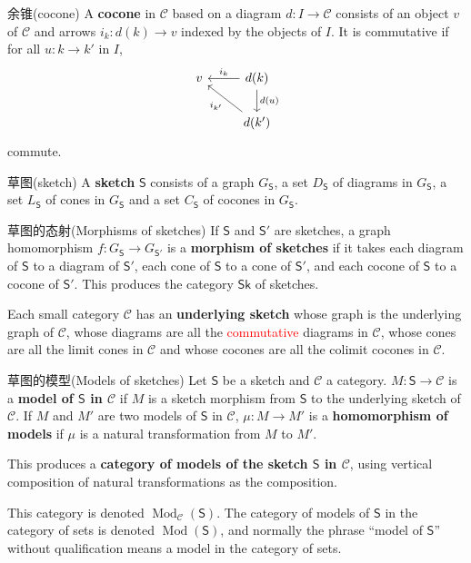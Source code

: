 \documentclass{beamer}
\begin{document}
\begin{frame}[fragile]{余锥(cocone)}
A \textbf{cocone} in $\mathcal{C}$ based on a diagram $d\colon I \to \mathcal{C}$ consists of an object $v$ of $\mathcal{C}$ and arrows $i_k\colon d(k) \to v$ indexed by the objects of $I$. It is commutative if for all $u\colon k \to k'$ in $I$,
\[
\begin{tikzcd}
v & d(k) \arrow[l, "i_k"'] \arrow[d, "d(u)"] \\
& d(k') \arrow[ul, "i_{k'}"]
\end{tikzcd}
\]
commute.
\end{frame}

\begin{frame}{草图(sketch)}
A \textbf{sketch} $\mathsf{S}$ consists of a graph $G_{\mathsf{S}}$, a set $D_{\mathsf{S}}$ of diagrams in $G_{\mathsf{S}}$, a set $L_{\mathsf{S}}$ of cones in $G_{\mathsf{S}}$ and a set $C_{\mathsf{S}}$ of cocones in $G_{\mathsf{S}}$.
\end{frame}

\begin{frame}{草图的态射(Morphisms of sketches)}
If $\mathsf{S}$ and $\mathsf{S}'$ are sketches, a graph homomorphism $f\colon G_{\mathsf{S}} \to G_{\mathsf{S}'}$ is a \textbf{morphism of sketches} if it takes each diagram of $\mathsf{S}$ to a diagram of $\mathsf{S}'$, each cone of $\mathsf{S}$ to a cone of $\mathsf{S}'$, and each cocone of $\mathsf{S}$ to a cocone of $\mathsf{S}'$. This produces the category $\mathbf{\mathsf{Sk}}$ of sketches.

\bigskip

Each small category $\mathcal{C}$ has an \textbf{underlying sketch} whose graph is the underlying graph of $\mathcal{C}$, whose diagrams are all the \textcolor{red}{commutative} diagrams in $\mathcal{C}$, whose cones are all the limit cones in $\mathcal{C}$ and whose cocones are all the colimit cocones in $\mathcal{C}$.
\end{frame}

\begin{frame}{草图的模型(Models of sketches)}
Let $\mathsf{S}$ be a sketch and $\mathcal{C}$ a category. $M\colon \mathsf{S} \to \mathcal{C}$ is a \textbf{model of $\mathsf{S}$ in $\mathcal{C}$} if $M$ is a sketch morphism from $\mathsf{S}$ to the underlying sketch of $\mathcal{C}$. If $M$ and $M'$ are two models of $\mathsf{S}$ in $\mathcal{C}$, $\mu\colon M \to M'$ is a \textbf{homomorphism of models} if $\mu$ is a natural transformation from $M$ to $M'$.

\bigskip

This produces a \textbf{category of models of the sketch $\mathsf{S}$ in $\mathcal{C}$}, using vertical composition of natural transformations as the composition.

This category is denoted $\operatorname{Mod}_{\mathcal{C}}(\mathsf{S})$. The category of models of $\mathsf{S}$ in the category of sets is denoted $\operatorname{Mod}(\mathsf{S})$, and normally the phrase ``model of $\mathsf{S}$'' without qualification means a model in the category of sets.
\end{frame}
\end{document}
